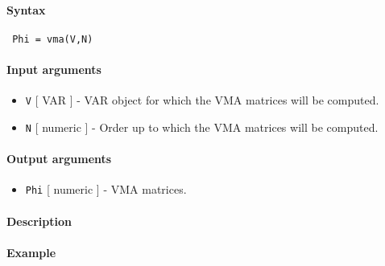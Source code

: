 


	\paragraph{Syntax}
 
 \begin{verbatim}
 Phi = vma(V,N)
 \end{verbatim}
 
 \paragraph{Input arguments}
 
 \begin{itemize}
 \item
   \texttt{V} {[} VAR {]} - VAR object for which the VMA matrices will be
   computed.
 \item
   \texttt{N} {[} numeric {]} - Order up to which the VMA matrices will
   be computed.
 \end{itemize}
 
 \paragraph{Output arguments}
 
 \begin{itemize}
 \item
   \texttt{Phi} {[} numeric {]} - VMA matrices.
 \end{itemize}
 
 \paragraph{Description}
 
 \paragraph{Example}


